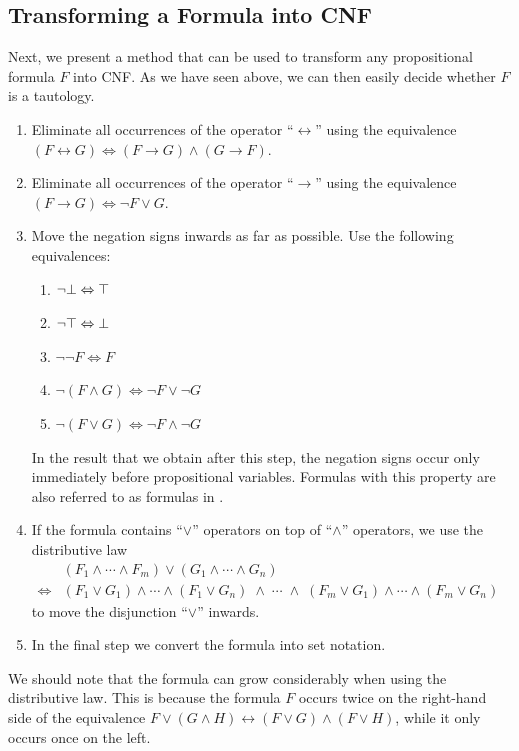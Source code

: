 \subsection{Transforming a Formula into CNF}
Next, we present a method that can be used to transform any propositional formula $F$ into CNF.  As we have
seen above, we can then easily decide whether $F$ is a tautology. 
\begin{enumerate}
\item Eliminate all occurrences of the operator ``$\leftrightarrow$'' using the equivalence \\[0.2cm]
      \hspace*{1.3cm} 
      $(F \leftrightarrow G) \Leftrightarrow (F \rightarrow G) \wedge (G \rightarrow F)$.
\item Eliminate all occurrences of the operator ``$\rightarrow$'' using the equivalence \\[0.2cm]
      \hspace*{1.3cm} 
      $(F \rightarrow G) \Leftrightarrow \neg F \vee G$.
\item Move the negation signs inwards as far as possible.  Use the following equivalences:
      \begin{enumerate}
      \item $\neg \bot \Leftrightarrow \top$
      \item $\neg \top \Leftrightarrow \bot$
      \item $\neg \neg F \Leftrightarrow F$
      \item $\neg (F \wedge G) \Leftrightarrow \neg F \vee \neg G$ 
      \item $\neg (F \vee G) \Leftrightarrow \neg F \wedge \neg G$ 
      \end{enumerate}
      In the result that we obtain after this step, the negation signs
      occur only immediately before propositional variables.  Formulas with this
      property are also referred to as formulas in .
\item If the formula contains ``$\vee$'' operators on top of ``$\wedge$'' operators, we use the distributive law \\[0.2cm]
      \hspace*{1.3cm} 
      $
      \begin{array}{cl}
                      & (F_1 \wedge \cdots \wedge F_m) \vee (G_1 \wedge \cdots \wedge G_n) \\[0.2cm]
      \Leftrightarrow & (F_1 \vee G_1) \wedge \cdots \wedge (F_1 \vee G_n) \;\wedge \;\cdots\; \wedge\;
                        (F_m \vee G_1) \wedge \cdots \wedge (F_m \vee G_n)
      \end{array}
      $
      \\[0.2cm]
      to move the disjunction ``$\vee$'' inwards.
\item In the final step we convert the formula into set notation.
\end{enumerate}
We should note that the formula can grow considerably when using the distributive law.
This is because the formula $F$ occurs twice on the right-hand side of the equivalence 
$F \vee (G \wedge H) \leftrightarrow (F \vee G) \wedge (F \vee H)$, while it only occurs once on the left. 

